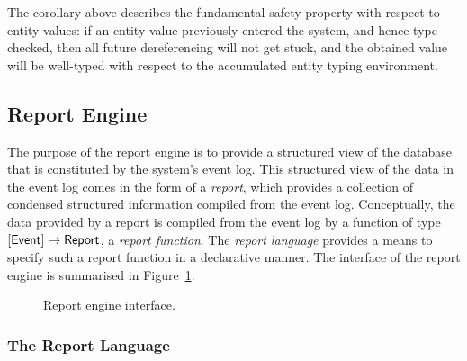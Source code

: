 The corollary above describes the fundamental safety property with
respect to entity values: if an entity value previously entered the
system, and hence type checked, then all future dereferencing will not
get stuck, and the obtained value will be well-typed with respect to
the accumulated entity typing environment.

\subsection{Report Engine}
\label{sec:report-engine}
The purpose of the report engine is to provide a structured view of
the database that is constituted by the system's event log. This
structured view of the data in the event log comes in the form of a
\emph{report}, which provides a collection of condensed structured
information compiled from the event log. Conceptually, the data
provided by a report is compiled from the event log by a function of
type $[\mathsf{Event}] \to \mathsf{Report}$, a \emph{report
  function}. The \emph{report language} provides a means to specify
such a report function in a declarative manner. The interface of the
report engine is summarised in Figure~\ref{fig:report-engine}.

\begin{figure}[t]
  \centering\small
  \newcommand\comp[4][]{%
    \node[box,#1] (#2) {#3\nodepart{two}#4};
  }%
  \caption{Report engine interface.}
  \label{fig:report-engine}
\end{figure}


\subsubsection{The Report Language}
\label{sec:report-language}

